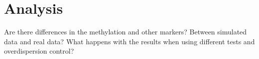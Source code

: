\section{Analysis}

Are there differences in the methylation and other markers?
Between simulated data and real data?
What happens with the results when using different tests and overdispersion control?
  